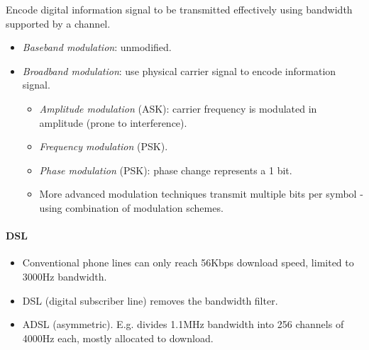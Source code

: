 \documentclass[twocolumn,english]{article}
\begin{document}
Encode digital information signal to be transmitted effectively using
bandwidth supported by a channel.
\begin{itemize}
\item \emph{Baseband modulation}: unmodified.
\item \emph{Broadband modulation}: use physical carrier signal to encode
information signal.
\begin{itemize}
\item \emph{Amplitude modulation} (ASK): carrier frequency is modulated
in amplitude (prone to interference).
\item \emph{Frequency modulation} (PSK).
\item \emph{Phase modulation} (PSK): phase change represents a 1 bit.
\item More advanced modulation techniques transmit multiple bits per symbol
- using combination of modulation schemes.
\end{itemize}
\end{itemize}

\paragraph{DSL}
\begin{itemize}
\item Conventional phone lines can only reach 56Kbps download speed, limited
to 3000Hz bandwidth.
\item DSL (digital subscriber line) removes the bandwidth filter.
\item ADSL (asymmetric). E.g. divides 1.1MHz bandwidth into 256 channels
of 4000Hz each, mostly allocated to download.
\end{itemize}
\end{document}
